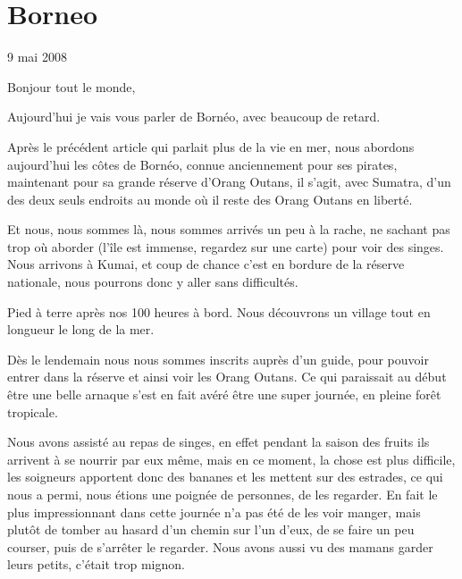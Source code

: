 \section{Borneo}

9 mai 2008

\begin{multicols}{2}

Bonjour tout le monde,

Aujourd'hui je vais vous parler de Bornéo, avec beaucoup de retard.

Après le précédent article qui parlait plus de la vie en mer, nous abordons aujourd'hui les côtes de Bornéo, connue anciennement pour ses pirates, maintenant pour sa grande réserve d'Orang Outans, il s'agit, avec Sumatra, d'un des deux seuls endroits au monde où il reste des Orang Outans en liberté.

Et nous, nous sommes là, nous sommes arrivés un peu à la rache, ne sachant pas trop où aborder (l'île est immense, regardez sur une carte) pour voir des singes. Nous arrivons à Kumai, et coup de chance c'est en bordure de la réserve nationale, nous pourrons donc y aller sans difficultés.

Pied à terre après nos 100 heures à bord. Nous découvrons un village tout en longueur le long de la mer.



Dès le lendemain nous nous sommes inscrits auprès d'un guide, pour pouvoir entrer dans la réserve et ainsi voir les Orang Outans. Ce qui paraissait au début être une belle arnaque s'est en fait avéré être une super journée, en pleine forêt tropicale.


Nous avons assisté au repas de singes, en effet pendant la saison des fruits ils arrivent à se nourrir par eux même, mais en ce moment, la chose est plus difficile, les soigneurs apportent donc des bananes et les mettent sur des estrades, ce qui nous a permi, nous étions une poignée de personnes, de les regarder. En fait le plus impressionnant dans cette journée n'a pas été de les voir manger, mais plutôt de tomber au hasard d'un chemin sur l'un d'eux, de se faire un peu courser, puis de s'arrêter le regarder. Nous avons aussi vu des mamans garder leurs petits, c'était trop mignon.


\end{multicols}
